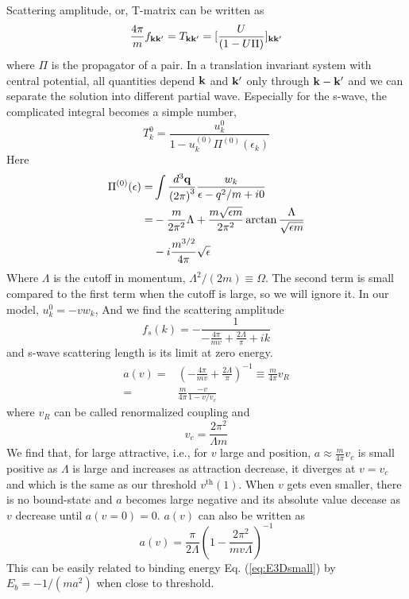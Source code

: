 \documentclass[3p,twocolumn]{elsarticle}
\begin{document}
Scattering amplitude, or, T-matrix can be written as 
\begin{equation}
\frac{4\pi}{m}f_{\mathbf{k}\mathbf{k}'}=T_{\mathbf{k}\mathbf{k}'}=[\frac{U}{(1-U\Pi)}]_{\mathbf{k}\mathbf{k}'}
\end{equation}
where $\Pi$ is the propagator of a pair.  In a translation invariant system with central potential, all quantities depend $\mathbf{k}$ and $\mathbf{k}'$ only through $\mathbf{k}-\mathbf{k}'$ and we can separate the solution into different partial wave. Especially for the s-wave, the complicated  integral becomes a simple number,
\begin{equation}
T^{0}_{k}=\frac{u^{0}_{k}}{1-u^{(0)}_{k}\Pi^{(0)}(\epsilon_k)}
\end{equation}
Here 
\begin{equation}
\begin{split}
\Pi^{(0)}(\epsilon)=&\int\frac{d^{3}\mathbf{q}}{{(2\pi)}^{3}}\frac{w_{k}}{\epsilon-q^{2}/m+i0}\\
=&-\frac{m}{2\pi^{2}}{\Lambda}+\frac{m\sqrt{\epsilon{m}}}{2\pi^{2}}\arctan\frac{\Lambda}{\sqrt{\epsilon{m}}}\\
&-i\frac{m^{3/2}}{4\pi}\sqrt{\epsilon}
\end{split}
\end{equation}
Where $\Lambda$ is the cutoff in momentum, $\Lambda^{2}/(2m)\equiv\Omega$. The second term is small compared to the first term when the cutoff is large, so we will ignore it.  In our model, $u^{0}_{k}=-vw_{k}$, And we find the scattering amplitude 
\begin{equation}
f_{s}(k)=-\frac{1}{-\frac{4\pi}{mv}+\frac{2\Lambda}{\pi}+ik}
\end{equation}
and s-wave scattering length is its limit at zero energy. 
\begin{equation}
\begin{split}
a(v)=&\left(-\frac{4\pi}{mv}+\frac{2\Lambda}{\pi}\right)^{-1}\equiv\frac{m}{4\pi}v_{R}\\
     =&\frac{m}{4\pi}\frac{-v}{1-v/v_{c}}
     \end{split}
\end{equation}
where $v_{R}$ can be called renormalized coupling and 
\begin{equation}
v_{c}=\frac{2\pi^{2}}{\Lambda{m}}
\end{equation}
We find that, for large attractive, i.e., for $v$ large and position, $a\approx\frac{m}{4\pi}v_c$ is small positive as $\Lambda$ is large and increases as attraction decrease, it diverges at $v=v_{c}$ and which is the same as our threshold $v^{\text{th}}(1)$.  When $v$ gets even smaller, there is no bound-state and $a$ becomes large negative and its absolute value decease as $v$ decrease until $a(v=0)=0$. 
$a(v)$ can also be written as
\begin{equation}
a(v)=\frac{\pi}{2\Lambda}\left(1-\frac{2\pi^{2}}{mv\Lambda}\right)^{-1}
\end{equation}
This can be easily related to binding energy Eq. (\ref{eq:E3Dsmall}) by $E_{b}=-1/(ma^{2})$ when close to threshold. 
\end{document}
